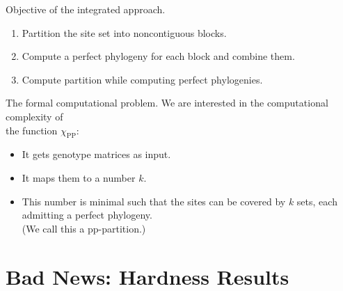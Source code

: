 \documentclass{beamer}
\begin{document}
\begin{frame}{Objective of the integrated approach.}
	\begin{enumerate}
		\item Partition the site set into \alert{noncontiguous} blocks. 
		\item Compute a perfect phylogeny for each block and combine them. 
		\item<alert@1-> Compute partition while computing perfect
			phylogenies. 
	\end{enumerate}

\end{frame}


\begin{frame}{The formal computational problem.}
	We are interested in the computational complexity of \\
	\alert{the function \alert{$\chi_{\operatorname{PP}}$}}:
	\begin{itemize}
		\item It gets genotype matrices as input.
		\item It maps them to a number $k$.
		\item This number is minimal such that the sites can be
			covered by $k$ sets, each admitting a perfect phylogeny.
			\\
			(We call this a \alert{pp-partition}.)
	\end{itemize}
\end{frame}


\section{Bad News: Hardness Results}
\end{document}
